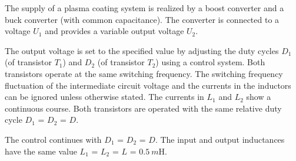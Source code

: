 
The supply of a plasma coating system is realized by a boost converter and a buck converter (with common capacitance).
The converter is connected to a voltage $U_\mathrm{1}$ and provides a variable output voltage $U_\mathrm{2}$.
\vspace{2em}\par

\par

\par


The output voltage is set to the specified value by adjusting the duty cycles $D_\mathrm{1}$ (of transistor $T_\mathrm{1}$) 
and $D_\mathrm{2}$ (of transistor $T_\mathrm{2}$) using a control system. Both transistors operate at the same switching frequency. 
The switching frequency fluctuation of the intermediate circuit voltage and the currents in the inductors can be ignored unless otherwise stated. 
The currents in $L_\mathrm{1}$ and $L_\mathrm{2}$ show a continuous course. Both transistors are operated with the 
same relative duty cycle $D_\mathrm{1}$ = $D_\mathrm{2}$ = $D$.




\vspace{2em}\par
The control continues with $D_\mathrm{1}$ = $D_\mathrm{2}$ = $D$. The input and output inductances 
have the same value $L_\mathrm{1}$ = $L_\mathrm{2}$ = $L$ = $\SI{0.5}{m\henry}$.



